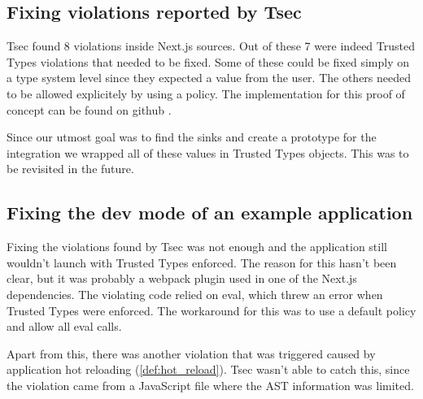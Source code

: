 \subsection{Fixing violations reported by Tsec}

Tsec found 8 violations \cite{tsec_output} inside Next.js sources. Out of these 7 were indeed
Trusted Types violations that needed to be fixed. Some of these could be fixed simply on a type
system level since they expected a value from the user. The others needed to be allowed explicitely
by using a policy. The implementation for this proof of concept can be found on github
\cite{nextjs_fix_tsec_violations_commit}.

Since our utmost goal was to find the sinks and create a prototype for the integration we wrapped
all of these values in Trusted Types objects. This was to be revisited in the future.

\subsection{Fixing the dev mode of an example application}

Fixing the violations found by Tsec was not enough and the application still wouldn't launch with
Trusted Types enforced. The reason for this hasn't been clear, but it was probably a webpack plugin
used in one of the Next.js dependencies. The violating code relied on eval, which threw an error
when Trusted Types were enforced. The workaround for this was to use a default policy and allow all
eval calls.

Apart from this, there was another violation that was triggered caused by application hot reloading
(\ref{def:hot_reload}). Tsec wasn't able to catch this, since the violation came from a JavaScript
file where the AST information was limited.


